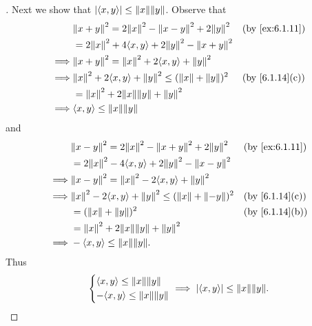 \begin{proof}[]
	Next we show that \(\abs{\inn{x, y}} \leq \norm{x} \norm{y}\).
	Observe that
	\begin{align*}
		         & \norm{x + y}^2 = 2 \norm{x}^2 - \norm{x - y}^2 + 2 \norm{y}^2       &  & \by{ex:6.1.11} \\
		         & = 2 \norm{x}^2 + 4 \inn{x, y} + 2 \norm{y}^2 - \norm{x + y}^2                           \\
		\implies & \norm{x + y}^2 = \norm{x}^2 + 2 \inn{x, y} + \norm{y}^2                                 \\
		\implies & \norm{x}^2 + 2 \inn{x, y} + \norm{y}^2 \leq (\norm{x} + \norm{y})^2 &  & \by{6.1.14}[c] \\
		         & = \norm{x}^2 + 2 \norm{x} \norm{y} + \norm{y}^2                                         \\
		\implies & \inn{x, y} \leq \norm{x} \norm{y}
	\end{align*}
	and
	\begin{align*}
		         & \norm{x - y}^2 = 2 \norm{x}^2 - \norm{x + y}^2 + 2 \norm{y}^2        &  & \by{ex:6.1.11} \\
		         & = 2 \norm{x}^2 - 4 \inn{x, y} + 2 \norm{y}^2 - \norm{x - y}^2                            \\
		\implies & \norm{x - y}^2 = \norm{x}^2 - 2 \inn{x, y} + \norm{y}^2                                  \\
		\implies & \norm{x}^2 - 2 \inn{x, y} + \norm{y}^2 \leq (\norm{x} + \norm{-y})^2 &  & \by{6.1.14}[c] \\
		         & = (\norm{x} + \norm{y})^2                                            &  & \by{6.1.14}[b] \\
		         & = \norm{x}^2 + 2 \norm{x} \norm{y} + \norm{y}^2                                          \\
		\implies & - \inn{x, y} \leq \norm{x} \norm{y}.
	\end{align*}
	Thus
	\[
		\begin{dcases}
			\inn{x, y} \leq \norm{x} \norm{y} \\
			-\inn{x, y} \leq \norm{x} \norm{y}
		\end{dcases} \implies \abs{\inn{x, y}} \leq \norm{x} \norm{y}.
	\]


\end{proof}
